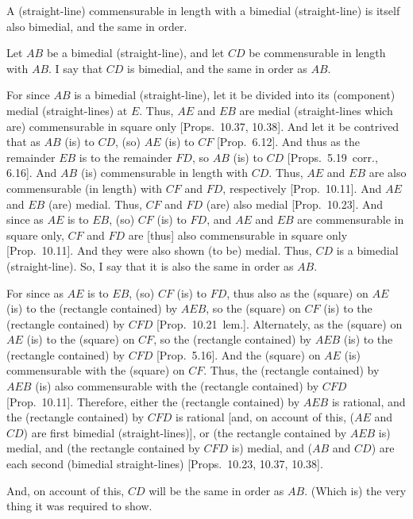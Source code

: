 \begin{Parallel}{}{}
{A (straight-line) commensurable
in length with a bimedial (straight-line) is  itself also bimedial, and
 the same in order.

\epsfysize=0.7in 
\centerline{}
 
Let $AB$ be a bimedial (straight-line), and let $CD$ be commensurable
in length with $AB$. I say that $CD$ is bimedial, and the same in order as
$AB$.

For since $AB$ is a bimedial (straight-line), let it be divided into its
(component) medial (straight-lines) at $E$. Thus, $AE$ and $EB$
are medial (straight-lines which are) commensurable in square only [Props.~10.37, 10.38]. And
let it be contrived that as $AB$ (is) to $CD$, (so) $AE$ (is)
to $CF$ [Prop.~6.12]. And thus as the remainder $EB$ is to the remainder $FD$, so $AB$ (is) to $CD$ [Props.~5.19~corr., 6.16].
And $AB$ (is) commensurable in length with $CD$. Thus, $AE$
and $EB$ are also commensurable (in length) with $CF$ and $FD$, respectively [Prop.~10.11]. And 
$AE$ and $EB$ (are) medial. Thus, $CF$ and $FD$ (are) also
medial [Prop.~10.23]. And since as $AE$
is to $EB$, (so) $CF$ (is) to $FD$, and $AE$ and $EB$ are commensurable
in square only, $CF$ and $FD$ are [thus] also commensurable in square only
[Prop.~10.11]. And they were also shown (to be)
medial. Thus, $CD$ is a bimedial (straight-line). So, I say that it is also the same in order as $AB$.

For since as $AE$ is to $EB$, (so) $CF$ (is) to $FD$, thus also as the
(square) on $AE$ (is) to the (rectangle contained) by $AEB$, so the (square)
on $CF$ (is) to the (rectangle contained) by $CFD$ [Prop.~10.21~lem.]. Alternately, as the (square)
on $AE$ (is) to the (square) on $CF$, so the (rectangle
contained) by $AEB$ (is) to the (rectangle contained) by $CFD$ [Prop.~5.16]. And the (square) on $AE$
(is) commensurable with the (square) on $CF$. Thus, the (rectangle
contained) by $AEB$ (is) also commensurable with the (rectangle contained)
by $CFD$ [Prop.~10.11]. Therefore,  either the
(rectangle contained) by $AEB$ is rational, and  the (rectangle contained) by
$CFD$ is rational [and, on account of this, ($AE$ and $CD$) are first
bimedial (straight-lines)], or (the rectangle contained by $AEB$ is) medial,
and (the rectangle contained by $CFD$ is) medial, and ($AB$ and
$CD$) are each second (bimedial straight-lines) [Props.~10.23, 10.37, 10.38].

And, on account of this, $CD$ will be  the same in order as $AB$.
(Which is) the very thing it was required to show.}
\end{Parallel}

